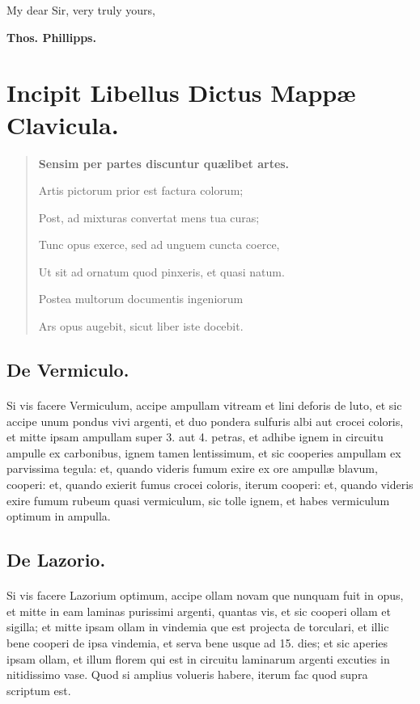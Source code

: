 \documentclass[a4paper, 11pt, oneside, polutonikogreek, italian]{article}
\begin{document}
My dear Sir, very truly yours, 

\bigskip

\textbf{Thos. Phillipps.}
\clearpage
\section{Incipit Libellus Dictus Mappæ Clavicula.}
\begin{quotation}\bfseries\footnotesize
Sensim per partes discuntur quælibet artes.

Artis pictorum prior est factura colorum;

Post, ad mixturas convertat mens tua curas;

Tunc opus exerce, sed ad unguem cuncta coerce,

Ut sit ad ornatum quod pinxeris, et quasi natum.

Postea multorum documentis ingeniorum

Ars opus augebit, sicut liber iste docebit.
\end{quotation}
\subsection{De Vermiculo.}
\paragraph{}
Si vis facere Vermiculum, accipe ampullam vitream et lini deforis de luto, et sic accipe unum pondus vivi argenti, et duo pondera sulfuris albi aut crocei coloris, et mitte ipsam ampullam super 3. aut 4. petras, et adhibe ignem in circuitu ampulle ex carbonibus, ignem tamen lentissimum, et sic cooperies ampullam ex parvissima tegula: et, quando videris fumum exire ex ore ampullæ blavum, cooperi: et, quando exierit fumus crocei coloris, iterum cooperi: et, quando videris exire fumum rubeum quasi vermiculum, sic tolle ignem, et habes vermiculum optimum in ampulla.

\subsection{De Lazorio.}
\paragraph{}
Si vis facere Lazorium optimum, accipe ollam novam que nunquam fuit in opus, et mitte in eam laminas purissimi argenti, quantas vis, et sic cooperi ollam et sigilla; et mitte ipsam ollam in vindemia que est projecta de torculari, et illic bene cooperi de ipsa vindemia, et serva bene usque ad 15. dies; et sic aperies ipsam ollam, et illum florem qui est in circuitu laminarum argenti excuties in nitidissimo vase. Quod si amplius volueris habere, iterum fac quod supra scriptum est.
\end{document}
